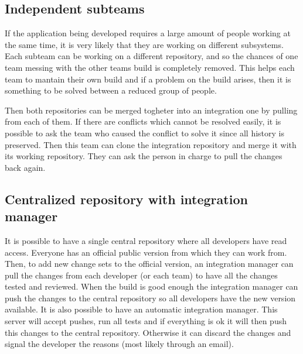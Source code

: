 \subsection{Independent subteams}
If the application being developed requires a large amount of people working at the same time, it is very likely that they are working on different subsystems. Each subteam can be working on a different repository, and so the chances of one team messing with the other teams build is completely removed. This helps each team to mantain their own build and if a problem on the build arises, then it is something to be solved between a reduced group of people.

Then both repositories can be merged togheter into an integration one by pulling from each of them. If there are conflicts which cannot be resolved easily, it is possible to ask the team who caused the conflict to solve it since all history is preserved. Then this team can clone the integration repository and merge it with its working repository. They can ask the person in charge to pull the changes back again.



\subsection{Centralized repository with integration manager}
It is possible to have a single central repository where all developers have read access. Everyone has an official public version from which they can work from. Then, to add new change sets to the official version, an integration manager can pull the changes from each developer (or each team) to have all the changes tested and reviewed. When the build is good enough the integration manager can push the changes to the central repository so all developers have the new version available.
It is also possible to have an automatic integration manager. This server will accept pushes, run all tests and if everything is ok it will then push this changes to the central repository. Otherwise it can discard the changes and signal the developer the reasons (most likely through an email).





